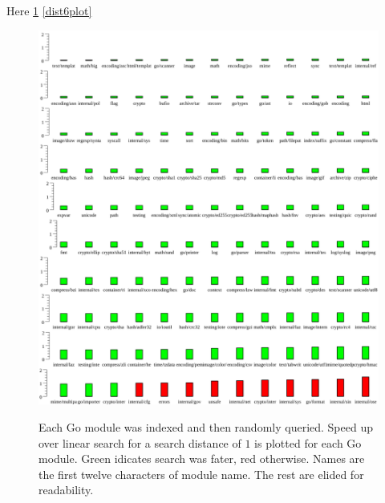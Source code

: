 Here \ref{dist1plot} \ref{dist6plot}
\begin{figure}
    \includegraphics[width=\textwidth]{example1.png}
    \label{dist1plot}
    \centering
    \caption{Each Go module was indexed and then randomly queried.
    Speed up over linear search for a search distance of $1$ is plotted for each Go module.
    Green idicates search was fater, red otherwise.
    Names are the first twelve characters of module name.
    The rest are elided for readability.}
\end{figure}
